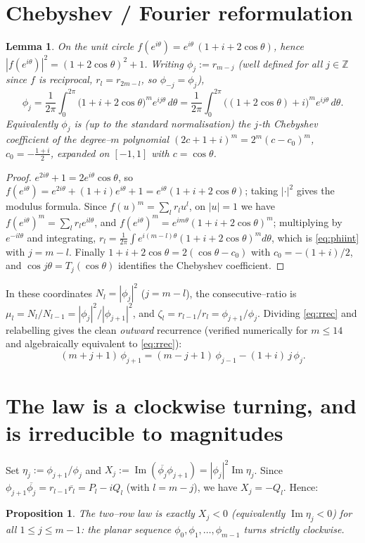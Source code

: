 \documentclass[11pt]{article}
\newtheorem{lemma}{Lemma}
\newtheorem{proposition}{Proposition}
\theoremstyle{definition}
\newcommand{\Z}{\mathbb{Z}}
\renewcommand{\Im}{\operatorname{Im}}
\begin{document}
\section{Chebyshev / Fourier reformulation}
\begin{lemma}\label{lem:cheb}
On the unit circle $f(e^{i\theta})=e^{i\theta}\,(1+i+2\cos\theta)$, hence
$|f(e^{i\theta})|^2=(1+2\cos\theta)^2+1$. Writing $\phi_j:=r_{m-j}$ (well defined for all
$j\in\Z$ since $f$ is reciprocal, $r_l=r_{2m-l}$, so $\phi_{-j}=\phi_j$),
\begin{equation}\label{eq:phiint}
\phi_j=\frac1{2\pi}\int_0^{2\pi}\bigl(1+i+2\cos\theta\bigr)^m e^{ij\theta}\,d\theta
      =\frac1{2\pi}\int_0^{2\pi}\bigl((1+2\cos\theta)+i\bigr)^m e^{ij\theta}\,d\theta .
\end{equation}
Equivalently $\phi_j$ is (up to the standard normalisation) the $j$-th Chebyshev
coefficient of the degree--$m$ polynomial $(2c+1+i)^m=2^m(c-c_0)^m$, $c_0=-\tfrac{1+i}2$,
expanded on $[-1,1]$ with $c=\cos\theta$.
\end{lemma}
\begin{proof}
$e^{2i\theta}+1=2e^{i\theta}\cos\theta$, so $f(e^{i\theta})=e^{2i\theta}+(1+i)e^{i\theta}+1
=e^{i\theta}(1+i+2\cos\theta)$; taking $|\cdot|^2$ gives the modulus formula. Since
$f(u)^m=\sum_l r_l u^l$, on $|u|=1$ we have $f(e^{i\theta})^m=\sum_l r_l e^{il\theta}$, and
$f(e^{i\theta})^m=e^{im\theta}(1+i+2\cos\theta)^m$; multiplying by $e^{-il\theta}$ and
integrating, $r_l=\frac1{2\pi}\int e^{i(m-l)\theta}(1+i+2\cos\theta)^m d\theta$, which is
\eqref{eq:phiint} with $j=m-l$. Finally $1+i+2\cos\theta=2(\cos\theta-c_0)$ with
$c_0=-(1+i)/2$, and $\cos j\theta=T_j(\cos\theta)$ identifies the Chebyshev coefficient.
\end{proof}

In these coordinates $N_l=|\phi_j|^2$ ($j=m-l$), the consecutive--ratio is
$\mu_l=N_l/N_{l-1}=|\phi_j|^2/|\phi_{j+1}|^2$, and $\zeta_l=r_{l-1}/r_l=\phi_{j+1}/\phi_j$.
Dividing \eqref{eq:rrec} and relabelling gives the clean \emph{outward} recurrence (verified
numerically for $m\le 14$ and algebraically equivalent to \eqref{eq:rrec}):
\begin{equation}\label{eq:star}
(m+j+1)\,\phi_{j+1}=(m-j+1)\,\phi_{j-1}-(1+i)\,j\,\phi_j .
\end{equation}

\section{The law is a clockwise turning, and is irreducible to magnitudes}
Set $\eta_j:=\phi_{j+1}/\phi_j$ and $X_j:=\Im(\overline{\phi_j}\phi_{j+1})=|\phi_j|^2\Im\eta_j$.
Since $\phi_{j+1}\overline{\phi_j}=r_{l-1}\overline{r_l}=P_l-iQ_l$ (with $l=m-j$), we have
$X_j=-Q_l$. Hence:
\begin{proposition}\label{prop:law}
The two--row law is exactly $X_j<0$ (equivalently $\Im\eta_j<0$) for all $1\le j\le m-1$:
the planar sequence $\phi_0,\phi_1,\dots,\phi_{m-1}$ turns strictly clockwise.
\end{proposition}
\end{document}
